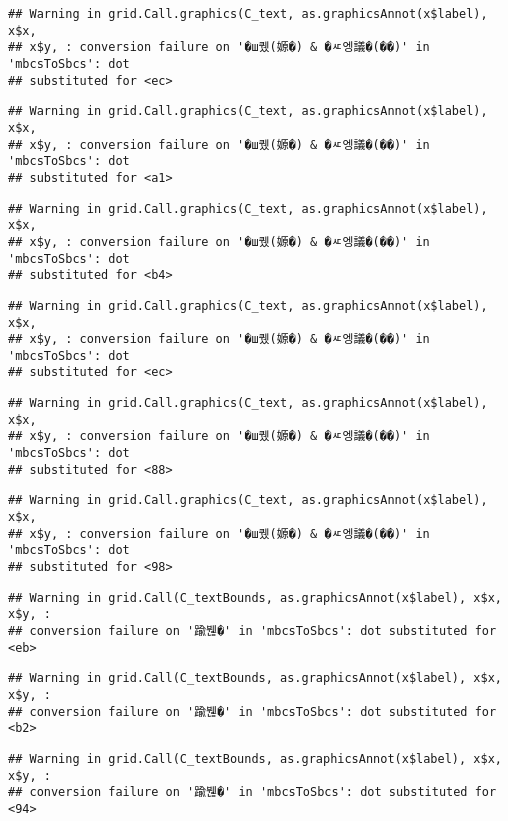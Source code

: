 \documentclass[
]{article}
\begin{document}
\begin{verbatim}
## Warning in grid.Call.graphics(C_text, as.graphicsAnnot(x$label), x$x,
## x$y, : conversion failure on '�ш퀬(嫄�) & �ㅼ엥議�(��)' in 'mbcsToSbcs': dot
## substituted for <ec>
\end{verbatim}

\begin{verbatim}
## Warning in grid.Call.graphics(C_text, as.graphicsAnnot(x$label), x$x,
## x$y, : conversion failure on '�ш퀬(嫄�) & �ㅼ엥議�(��)' in 'mbcsToSbcs': dot
## substituted for <a1>
\end{verbatim}

\begin{verbatim}
## Warning in grid.Call.graphics(C_text, as.graphicsAnnot(x$label), x$x,
## x$y, : conversion failure on '�ш퀬(嫄�) & �ㅼ엥議�(��)' in 'mbcsToSbcs': dot
## substituted for <b4>
\end{verbatim}

\begin{verbatim}
## Warning in grid.Call.graphics(C_text, as.graphicsAnnot(x$label), x$x,
## x$y, : conversion failure on '�ш퀬(嫄�) & �ㅼ엥議�(��)' in 'mbcsToSbcs': dot
## substituted for <ec>
\end{verbatim}

\begin{verbatim}
## Warning in grid.Call.graphics(C_text, as.graphicsAnnot(x$label), x$x,
## x$y, : conversion failure on '�ш퀬(嫄�) & �ㅼ엥議�(��)' in 'mbcsToSbcs': dot
## substituted for <88>
\end{verbatim}

\begin{verbatim}
## Warning in grid.Call.graphics(C_text, as.graphicsAnnot(x$label), x$x,
## x$y, : conversion failure on '�ш퀬(嫄�) & �ㅼ엥議�(��)' in 'mbcsToSbcs': dot
## substituted for <98>
\end{verbatim}

\begin{verbatim}
## Warning in grid.Call(C_textBounds, as.graphicsAnnot(x$label), x$x, x$y, :
## conversion failure on '踰붾�' in 'mbcsToSbcs': dot substituted for <eb>
\end{verbatim}

\begin{verbatim}
## Warning in grid.Call(C_textBounds, as.graphicsAnnot(x$label), x$x, x$y, :
## conversion failure on '踰붾�' in 'mbcsToSbcs': dot substituted for <b2>
\end{verbatim}

\begin{verbatim}
## Warning in grid.Call(C_textBounds, as.graphicsAnnot(x$label), x$x, x$y, :
## conversion failure on '踰붾�' in 'mbcsToSbcs': dot substituted for <94>
\end{verbatim}
\end{document}
